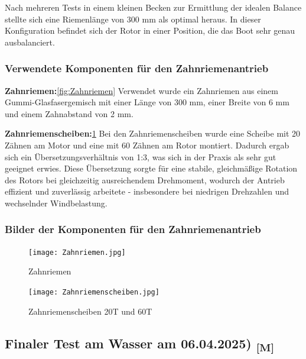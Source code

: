 \documentclass[a4paper,12pt]{article}
\begin{document}
Nach mehreren Tests in einem kleinen Becken zur Ermittlung der idealen Balance stellte sich eine Riemenlänge von 300 mm als optimal heraus. In dieser Konfiguration befindet sich der Rotor in einer Position, die das Boot sehr genau ausbalanciert.\newline

\subsubsection{Verwendete Komponenten für den Zahnriemenantrieb}


\textbf{Zahnriemen:}\ref{fig:Zahnriemen}
Verwendet wurde ein Zahnriemen aus einem Gummi-Glasfasergemisch mit einer Länge von 300 mm, einer Breite von 6 mm und einem Zahnabstand von 2 mm.\cite{Riemen_für_Antrieb}\newline

\textbf{Zahnriemenscheiben:}\ref{fig:Zahnriemenscheiben}
Bei den Zahnriemenscheiben wurde eine Scheibe mit 20 Zähnen am Motor und eine mit 60 Zähnen am Rotor montiert. Dadurch ergab sich ein Übersetzungsverhältnis von 1:3, was sich in der Praxis als sehr gut geeignet erwies. Diese Übersetzung sorgte für eine stabile, gleichmäßige Rotation des Rotors bei gleichzeitig ausreichendem Drehmoment, wodurch der Antrieb effizient und zuverlässig arbeitete - insbesondere bei niedrigen Drehzahlen und wechselnder Windbelastung.\cite{Zahnriemenscheiben}

\subsubsection{Bilder der Komponenten für den Zahnriemenantrieb}

\begin{figure}[H]
    \centering
    \begin{minipage}[b]{0.45\linewidth}
        \centering
        \texttt{[image: Zahnriemen.jpg]}
        \caption{Zahnriemen\cite{Riemen_für_Antrieb}}
        \label{fig:Zahnriemen}
    \end{minipage}
    \hfill
    \begin{minipage}[b]{0.45\linewidth}
        \centering
        \texttt{[image: Zahnriemenscheiben.jpg]}
        \caption{Zahnriemenscheiben 20T und 60T\cite{Zahnriemenscheiben}}
        \label{fig:Zahnriemenscheiben}
    \end{minipage}
\end{figure}

\newpage

\subsection{\texorpdfstring{Finaler Test am Wasser am 06.04.2025) \textsubscript{[M]}}{Finaler Test am Wasser am 06.04.2025) [M]}}
\end{document}
